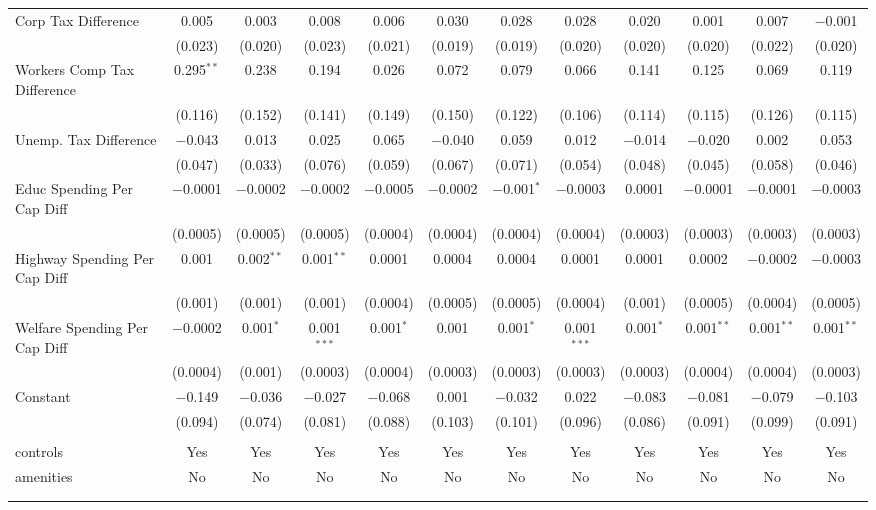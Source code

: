 \begin{table}[!htbp]
\begin{tabular}{@{\extracolsep{5pt}}lccccccccccc}
  Corp Tax Difference & 0.005 & 0.003 & 0.008 & 0.006 & 0.030 & 0.028 & 0.028 & 0.020 & 0.001 & 0.007 & $-$0.001 \\ 
  & (0.023) & (0.020) & (0.023) & (0.021) & (0.019) & (0.019) & (0.020) & (0.020) & (0.020) & (0.022) & (0.020) \\ 
  Workers Comp Tax Difference & 0.295$^{**}$ & 0.238 & 0.194 & 0.026 & 0.072 & 0.079 & 0.066 & 0.141 & 0.125 & 0.069 & 0.119 \\ 
  & (0.116) & (0.152) & (0.141) & (0.149) & (0.150) & (0.122) & (0.106) & (0.114) & (0.115) & (0.126) & (0.115) \\ 
  Unemp. Tax Difference & $-$0.043 & 0.013 & 0.025 & 0.065 & $-$0.040 & 0.059 & 0.012 & $-$0.014 & $-$0.020 & 0.002 & 0.053 \\ 
  & (0.047) & (0.033) & (0.076) & (0.059) & (0.067) & (0.071) & (0.054) & (0.048) & (0.045) & (0.058) & (0.046) \\ 
  Educ Spending Per Cap Diff & $-$0.0001 & $-$0.0002 & $-$0.0002 & $-$0.0005 & $-$0.0002 & $-$0.001$^{*}$ & $-$0.0003 & 0.0001 & $-$0.0001 & $-$0.0001 & $-$0.0003 \\ 
  & (0.0005) & (0.0005) & (0.0005) & (0.0004) & (0.0004) & (0.0004) & (0.0004) & (0.0003) & (0.0003) & (0.0003) & (0.0003) \\ 
  Highway Spending Per Cap Diff & 0.001 & 0.002$^{**}$ & 0.001$^{**}$ & 0.0001 & 0.0004 & 0.0004 & 0.0001 & 0.0001 & 0.0002 & $-$0.0002 & $-$0.0003 \\ 
  & (0.001) & (0.001) & (0.001) & (0.0004) & (0.0005) & (0.0005) & (0.0004) & (0.001) & (0.0005) & (0.0004) & (0.0005) \\ 
  Welfare Spending Per Cap Diff & $-$0.0002 & 0.001$^{*}$ & 0.001$^{***}$ & 0.001$^{*}$ & 0.001 & 0.001$^{*}$ & 0.001$^{***}$ & 0.001$^{*}$ & 0.001$^{**}$ & 0.001$^{**}$ & 0.001$^{**}$ \\ 
  & (0.0004) & (0.001) & (0.0003) & (0.0004) & (0.0003) & (0.0003) & (0.0003) & (0.0003) & (0.0004) & (0.0004) & (0.0003) \\ 
  Constant & $-$0.149 & $-$0.036 & $-$0.027 & $-$0.068 & 0.001 & $-$0.032 & 0.022 & $-$0.083 & $-$0.081 & $-$0.079 & $-$0.103 \\ 
  & (0.094) & (0.074) & (0.081) & (0.088) & (0.103) & (0.101) & (0.096) & (0.086) & (0.091) & (0.099) & (0.091) \\ 
 \hline \\[-1.8ex] 
controls & Yes & Yes & Yes & Yes & Yes & Yes & Yes & Yes & Yes & Yes & Yes \\ 
amenities & No & No & No & No & No & No & No & No & No & No & No \\ 
\hline \\[-1.8ex] 
\hline 
\hline \\[-1.8ex] 
\end{tabular} 
\end{table} 
